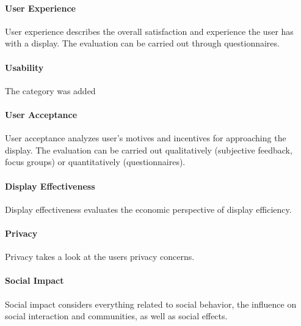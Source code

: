 


	\paragraph{User Experience}

		User experience describes the overall satisfaction and experience the user has with a display. The evaluation can be carried out through questionnaires.
	
	\paragraph{Usability}

	The category was added 

	\paragraph{User Acceptance}

		User acceptance analyzes user's motives and incentives for approaching the display. The evaluation can be carried out qualitatively (subjective feedback, focus groups) or quantitatively (questionnaires).

	\paragraph{Display Effectiveness}
		Display effectiveness evaluates the economic perspective of display efficiency. 

	\paragraph{Privacy}
		Privacy takes a look at the users privacy concerns.

	\paragraph{Social Impact}
		Social impact considers everything related to social behavior, the influence on social interaction and communities, as well as social effects.

